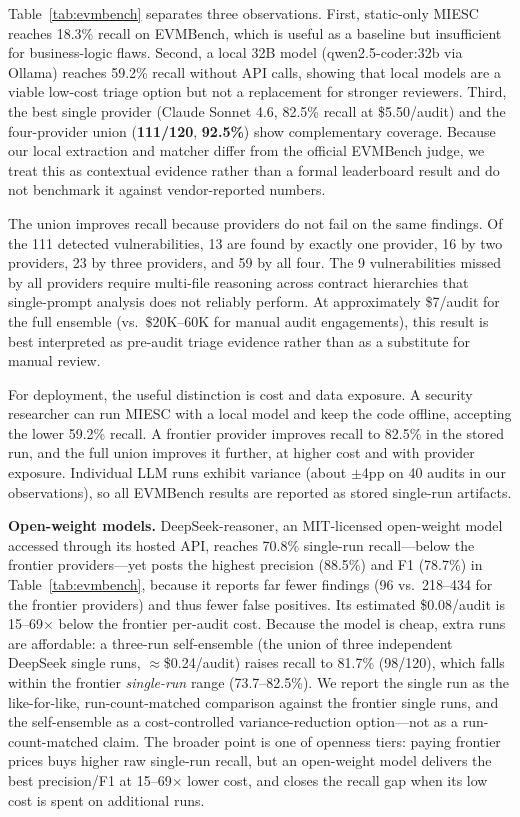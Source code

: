 \documentclass[conference]{IEEEtran}
\begin{document}
Table~\ref{tab:evmbench} separates three observations. First, static-only MIESC reaches 18.3\% recall on EVMBench, which is useful as a baseline but insufficient for business-logic flaws. Second, a local 32B model (qwen2.5-coder:32b via Ollama) reaches 59.2\% recall without API calls, showing that local models are a viable low-cost triage option but not a replacement for stronger reviewers. Third, the best single provider (Claude Sonnet 4.6, 82.5\% recall at \$5.50/audit) and the four-provider union (\textbf{111/120}, \textbf{92.5\%}) show complementary coverage. Because our local extraction and matcher differ from the official EVMBench judge, we treat this as contextual evidence rather than a formal leaderboard result and do not benchmark it against vendor-reported numbers.

The union improves recall because providers do not fail on the same findings. Of the 111 detected vulnerabilities, 13 are found by exactly one provider, 16 by two providers, 23 by three providers, and 59 by all four. The 9 vulnerabilities missed by all providers require multi-file reasoning across contract hierarchies that single-prompt analysis does not reliably perform. At approximately \$7/audit for the full ensemble (vs.\ \$20K--60K for manual audit engagements), this result is best interpreted as pre-audit triage evidence rather than as a substitute for manual review.

For deployment, the useful distinction is cost and data exposure. A security researcher can run MIESC with a local model and keep the code offline, accepting the lower 59.2\% recall. A frontier provider improves recall to 82.5\% in the stored run, and the full union improves it further, at higher cost and with provider exposure. Individual LLM runs exhibit variance (about $\pm$4pp on 40 audits in our observations), so all EVMBench results are reported as stored single-run artifacts.

\textbf{Open-weight models.} DeepSeek-reasoner, an MIT-licensed open-weight model accessed through its hosted API, reaches 70.8\% single-run recall---below the frontier providers---yet posts the highest precision (88.5\%) and F1 (78.7\%) in Table~\ref{tab:evmbench}, because it reports far fewer findings (96 vs.\ 218--434 for the frontier providers) and thus fewer false positives. Its estimated \$0.08/audit is 15--69$\times$ below the frontier per-audit cost. Because the model is cheap, extra runs are affordable: a three-run self-ensemble (the union of three independent DeepSeek single runs, $\approx$\$0.24/audit) raises recall to 81.7\% (98/120), which falls within the frontier \emph{single-run} range (73.7--82.5\%). We report the single run as the like-for-like, run-count-matched comparison against the frontier single runs, and the self-ensemble as a cost-controlled variance-reduction option---not as a run-count-matched claim. The broader point is one of openness tiers: paying frontier prices buys higher raw single-run recall, but an open-weight model delivers the best precision/F1 at 15--69$\times$ lower cost, and closes the recall gap when its low cost is spent on additional runs.
\end{document}
